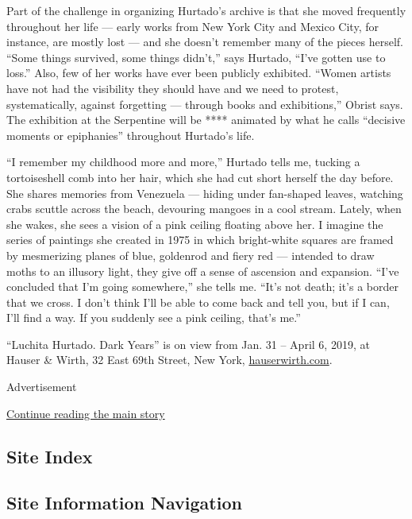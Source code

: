 Part of the challenge in organizing Hurtado's archive is that she moved
frequently throughout her life --- early works from New York City and
Mexico City, for instance, are mostly lost --- and she doesn't remember
many of the pieces herself. ``Some things survived, some things
didn't,'' says Hurtado, ``I've gotten use to loss.'' Also, few of her
works have ever been publicly exhibited. ``Women artists have not had
the visibility they should have and we need to protest, systematically,
against forgetting --- through books and exhibitions,'' Obrist says. The
exhibition at the Serpentine will be **** animated by what he calls
``decisive moments or epiphanies'' throughout Hurtado's life.

``I remember my childhood more and more,'' Hurtado tells me, tucking a
tortoiseshell comb into her hair, which she had cut short herself the
day before. She shares memories from Venezuela --- hiding under
fan-shaped leaves, watching crabs scuttle across the beach, devouring
mangoes in a cool stream. Lately, when she wakes, she sees a vision of a
pink ceiling floating above her. I imagine the series of paintings she
created in 1975 in which bright-white squares are framed by mesmerizing
planes of blue, goldenrod and fiery red --- intended to draw moths to an
illusory light, they give off a sense of ascension and expansion. ``I've
concluded that I'm going somewhere,'' she tells me. ``It's not death;
it's a border that we cross. I don't think I'll be able to come back and
tell you, but if I can, I'll find a way. If you suddenly see a pink
ceiling, that's me.''

``Luchita Hurtado. Dark Years'' is on view from Jan. 31 -- April 6,
2019, at Hauser \& Wirth, 32 East 69th Street, New York,
\href{https://www.hauserwirth.com/}{hauserwirth.com}.

Advertisement

\protect\hyperlink{after-bottom}{Continue reading the main story}

\hypertarget{site-index}{%
\subsection{Site Index}\label{site-index}}

\hypertarget{site-information-navigation}{%
\subsection{Site Information
Navigation}\label{site-information-navigation}}

